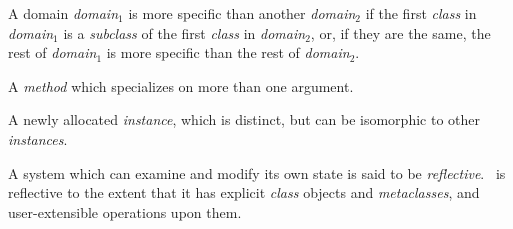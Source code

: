 \begin{optDefinition}
\begin{definitions}


     
     A domain {\em domain$_1$} is more
    specific than another {\em domain$_2$} if the first {\em class} in {\em
        domain$_1$} is a {\em subclass} of the first {\em class} in {\em
        domain$_2$}, or, if they are the same, the rest of {\em domain$_1$} is
    more specific than the rest of {\em domain$_2$}.

      A {\em method} which
    specializes on more than one argument.

     A newly allocated
    {\em instance}, which is distinct, but can be isomorphic to other {\em
        instances}.


      A system which can
    examine and modify its own state is said to be {\em reflective}.  \eulisp\
    is reflective to the extent that it has explicit {\em class} objects and
    {\em metaclasses}, and user-extensible operations upon them.


\end{definitions}
\end{optDefinition}
